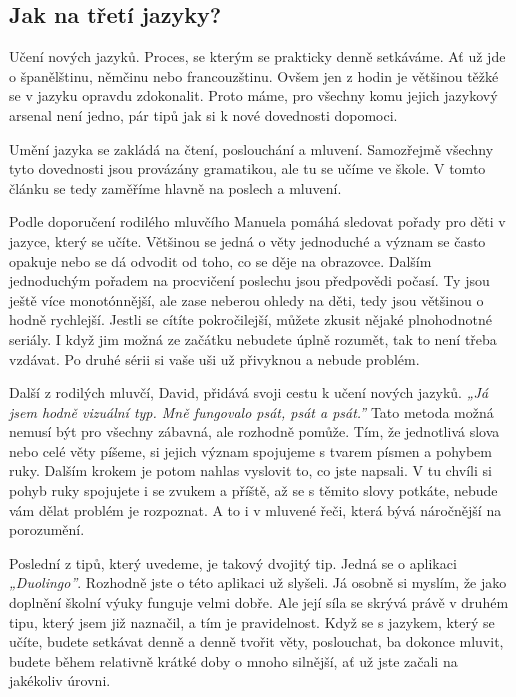 \documentclass[12pt, a4paper]{article}
\begin{document}
	\begin{multicols}{2}
		\setlength{\columnseprule}{1pt}
		
		\section*{Jak na třetí jazyky?}

		Učení nových jazyků. Proces, se kterým se prakticky denně setkáváme. Ať už jde o španělštinu, němčinu nebo francouzštinu. Ovšem jen z hodin je většinou těžké se v jazyku opravdu zdokonalit. Proto máme, pro všechny komu jejich jazykový arsenal není jedno, pár tipů jak si k nové dovednosti dopomoci. \par
		Umění jazyka se zakládá na čtení, poslouchání a mluvení. Samozřejmě všechny tyto dovednosti jsou provázány gramatikou, ale tu se učíme ve škole. V tomto článku se tedy zaměříme hlavně na poslech a mluvení. \par
		Podle doporučení rodilého mluvčího Manuela pomáhá sledovat pořady pro děti v jazyce, který se učíte. Většinou se jedná o věty jednoduché a význam se často opakuje nebo se dá odvodit od toho, co se děje na obrazovce. Dalším jednoduchým pořadem na procvičení poslechu jsou předpovědi počasí. Ty jsou ještě více monotónnější, ale zase neberou ohledy na děti, tedy jsou většinou o hodně rychlejší. Jestli se cítíte pokročilejší, můžete zkusit nějaké plnohodnotné seriály. I když jim možná ze začátku nebudete úplně rozumět, tak to není třeba vzdávat. Po druhé sérii si vaše uši už přivyknou a nebude problém. \par
		Další  z rodilých mluvčí, David, přidává svoji cestu k učení nových jazyků. \emph{„Já jsem hodně vizuální typ. Mně fungovalo psát, psát a psát.”} Tato metoda možná nemusí být pro všechny zábavná, ale rozhodně pomůže. Tím, že jednotlivá slova nebo celé věty píšeme, si jejich význam spojujeme s tvarem písmen a pohybem ruky. Dalším krokem je potom nahlas vyslovit to, co jste napsali. V tu chvíli si pohyb ruky spojujete i se zvukem a příště, až se s těmito slovy potkáte, nebude vám dělat problém je rozpoznat. A to i v mluvené řeči, která bývá náročnější na porozumění. \par
		Poslední z tipů, který uvedeme, je takový dvojitý tip. Jedná se o aplikaci \emph{„Duolingo”}. Rozhodně jste o této aplikaci už slyšeli. Já osobně si myslím, že jako doplnění školní výuky funguje velmi dobře. Ale její síla se skrývá právě v druhém tipu, který jsem již naznačil, a tím je pravidelnost. Když se s jazykem, který se učíte, budete setkávat denně a denně tvořit věty, poslouchat, ba dokonce mluvit, budete během relativně krátké doby o mnoho silnější, ať už jste začali na jakékoliv úrovni. \par

\end{multicols}
\end{document}
